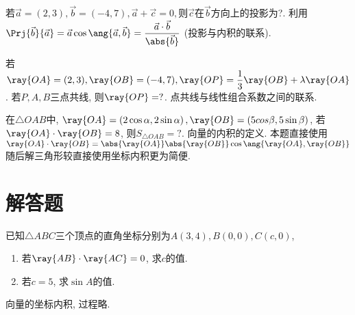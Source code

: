 \documentclass[8pt]{article}
\begin{document}
		\begin{easonbigproblem}
			若\(\vec{a}=(2, 3), \vec{b}=(-4, 7), \vec{a} + \vec{c} = 0,\)则\(\vec{c}\)在\(\vec{b}\)方向上的投影为?.
			\subbigproblem
			 利用\(\displaystyle \Prj{\vec{b}}{\vec{a}} = \vec{a} \cos \ang{\vec{a}, \vec{b}} = \frac{\vec{a} \cdot \vec{b}}{\abs{\vec{b}}}\) (投影与内积的联系).
		\end{easonbigproblem}

		\begin{easonbigproblem}
			若\(\ray{OA} = (2, 3), \ray{OB} = (-4, 7), \ray{OP} = \dfrac{1}{3} \ray{OB} + \lambda \ray{OA}\). 若\(P, A, B\)三点共线, 则\(\ray{OP} = ?\).
			\subbigproblem
			 点共线与线性组合系数之间的联系.
		\end{easonbigproblem}

		\begin{easonbigproblem}
			在\(\triangle OAB\)中, \(\ray{OA} = \left(2 \cos \alpha, 2 \sin \alpha\right), \ray{OB} = \left(5 cos \beta, 5 \sin \beta\right)\), 若\(\ray{OA} \cdot \ray{OB} = 8\), 则\(S_{\triangle OAB} = ?\).
			\subbigproblem
			 向量的内积的定义. 本题直接使用\(\displaystyle \ray{OA} \cdot \ray{OB} = \abs{\ray{OA}} \abs{\ray{OB}} \cos \ang{\ray{OA}, \ray{OB}}\)随后解三角形较直接使用坐标内积更为简便.
		\end{easonbigproblem}

	\section{解答题}
		
		\begin{easonproblem}
			已知\(\triangle ABC\)三个顶点的直角坐标分别为\(A(3, 4), B(0, 0), C(c, 0)\),
			\begin{enumerate} [label = \calword{(\arabic*)}]
				\item 若\(\ray{AB} \cdot \ray{AC} = 0\), 求\(c\)的值.
				\item 若\(c = 5\), 求\(\sin A\)的值.
			\end{enumerate}
			\subproblem
			 向量的坐标内积, 过程略.
		\end{easonproblem}
\end{document}
